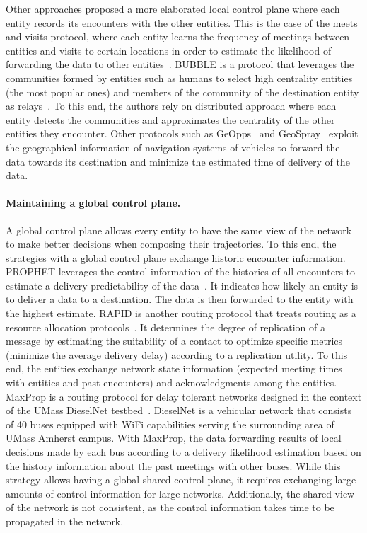 Other approaches proposed a more elaborated local control plane where each entity records its encounters with the other entities. This is the case of the meets and visits protocol, where each entity learns the frequency of meetings between entities and visits to certain locations in order to estimate the likelihood of forwarding the data to other entities~\cite{burns2005mv}. BUBBLE is a protocol that leverages the communities formed by entities such as humans to select high centrality entities (the most popular ones) and members of the community of the destination entity as relays~\cite{hui2011bubble}. To this end, the authors rely on distributed approach where each entity detects the communities and approximates the centrality of the other entities they encounter. Other protocols such as GeOpps~\cite{leontiadis2007geopps} and GeoSpray~\cite{soares2014geospray} exploit the geographical information of navigation systems of vehicles to forward the data towards its destination and minimize the estimated time of delivery of the data.

\paragraph{Maintaining a global control plane.}
A global control plane allows every entity to have the same view of the network to make better decisions when composing their trajectories. To this end, the strategies with a global control plane exchange historic encounter information.  PROPHET leverages the control information of the histories of all encounters to estimate a delivery predictability of the data~\cite{lindgren2003probabilistic}. It indicates how likely an entity is to deliver a data to a destination. The data is then forwarded to the entity with the highest estimate. RAPID is another routing protocol that treats routing as a resource allocation protocols~\cite{balasubramanian2010replication}. It determines the degree of replication of a message by estimating the suitability of a contact to optimize specific metrics (\eg minimize the average delivery delay) according to a replication utility. To this end, the entities exchange network state information (\eg expected meeting times with entities and past encounters) and acknowledgments among the entities. MaxProp is a routing protocol for delay tolerant networks designed in the context of the UMass DieselNet testbed~\cite{burgess2006maxprop}. DieselNet is a vehicular network that consists of 40 buses equipped with WiFi capabilities serving the surrounding area of UMass Amherst campus. With MaxProp, the data forwarding results of local decisions made by each bus according to a delivery likelihood estimation based on the history information about the past meetings with other buses. While this strategy allows having a global shared control plane, it requires exchanging large amounts of control information for large networks. Additionally, the shared view of the network is not consistent, as the control information takes time to be propagated in the network.

